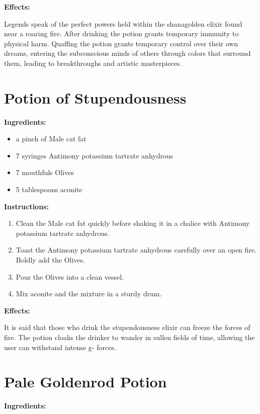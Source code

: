 \documentclass{article}
\begin{document}
\textbf{Effects:}

Legends speak of the perfect powers held within the shanagolden elixir found near a roaring fire. After drinking the potion grants temporary immunity to physical harm. Quaffing the potion grants temporary control over their own dreams, entering the subconscious minds of others through colors that surround them, leading to breakthroughs and artistic masterpieces.

\newpage
\section*{Potion of Stupendousness}

\textbf{Ingredients:}

\begin{itemize}
  \item a pinch of Male cat fat
  \item 7 syringes Antimony potassium tartrate anhydrous
  \item 7 mouthfuls Olives
  \item 5 tablespoons aconite
\end{itemize}

\textbf{Instructions:}

\begin{enumerate}
  \item Clean the Male cat fat quickly before shaking it in a chalice with Antimony potassium tartrate anhydrous.
  \item Toast the Antimony potassium tartrate anhydrous carefully over an open fire. Boldly add the Olives.
  \item Pour the Olives into a clean vessel.
  \item Mix aconite and the mixture in a sturdy drum.
\end{enumerate}

\textbf{Effects:}

It is said that those who drink the stupendousness elixir can freeze the forces of fire. The potion cloaks the drinker to wander in sullen fields of time, allowing the user can withstand intense g- forces.

\newpage
\section*{Pale Goldenrod Potion}

\textbf{Ingredients:}
\end{document}
